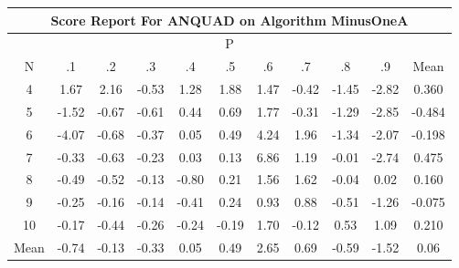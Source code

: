 \documentclass[11pt,a4paper]{report}
\begin{document}
\begin{longtable}{ | c || c | c | c | c | c | c | c | c | c || c |}
\hline
\multicolumn{11}{|c|}{ Score Report For ANQUAD on Algorithm MinusOneA} \\
\hline
\multicolumn{11}{|c|}{ P } \\
\hline
N & .1 & .2 & .3 & .4 & .5 & .6 & .7 & .8 & .9 & Mean\\
 \hline
 \hline
 \endhead
  4 &  \cellcolor[HTML]{D7D7FF} 1.67 &  \cellcolor[HTML]{C7C7FF} 2.16 &  \cellcolor[HTML]{FFEFEF} -0.53 &  \cellcolor[HTML]{DFDFFF} 1.28 &  \cellcolor[HTML]{CFCFFF} 1.88 &  \cellcolor[HTML]{D7D7FF} 1.47 &  \cellcolor[HTML]{FFF7F7} -0.42 &  \cellcolor[HTML]{FFD7D7} -1.45 &  \cellcolor[HTML]{FFB7B7} -2.82 & 0.360 \\
  5 &  \cellcolor[HTML]{FFD7D7} -1.52 &  \cellcolor[HTML]{FFEFEF} -0.67 &  \cellcolor[HTML]{FFEFEF} -0.61 &  \cellcolor[HTML]{F7F7FF} 0.44 &  \cellcolor[HTML]{EFEFFF} 0.69 &  \cellcolor[HTML]{CFCFFF} 1.77 &  \cellcolor[HTML]{FFF7F7} -0.31 &  \cellcolor[HTML]{FFDFDF} -1.29 &  \cellcolor[HTML]{FFB7B7} -2.85 & -0.484 \\
  6 &  \cellcolor[HTML]{FF9797} -4.07 &  \cellcolor[HTML]{FFEFEF} -0.68 &  \cellcolor[HTML]{FFF7F7} -0.37 &  \cellcolor[HTML]{FFFFFF} 0.05 &  \cellcolor[HTML]{EFEFFF} 0.49 &  \cellcolor[HTML]{9797FF} 4.24 &  \cellcolor[HTML]{CFCFFF} 1.96 &  \cellcolor[HTML]{FFDFDF} -1.34 &  \cellcolor[HTML]{FFC7C7} -2.07 & -0.198 \\
  7 &  \cellcolor[HTML]{FFF7F7} -0.33 &  \cellcolor[HTML]{FFEFEF} -0.63 &  \cellcolor[HTML]{FFF7F7} -0.23 &  \cellcolor[HTML]{FFFFFF} 0.03 &  \cellcolor[HTML]{FFFFFF} 0.13 &  \cellcolor[HTML]{5050FF} 6.86 &  \cellcolor[HTML]{DFDFFF} 1.19 &  \cellcolor[HTML]{FFFFFF} -0.01 &  \cellcolor[HTML]{FFB7B7} -2.74 & 0.475 \\
  8 &  \cellcolor[HTML]{FFEFEF} -0.49 &  \cellcolor[HTML]{FFEFEF} -0.52 &  \cellcolor[HTML]{FFFFFF} -0.13 &  \cellcolor[HTML]{FFE7E7} -0.80 &  \cellcolor[HTML]{F7F7FF} 0.21 &  \cellcolor[HTML]{D7D7FF} 1.56 &  \cellcolor[HTML]{D7D7FF} 1.62 &  \cellcolor[HTML]{FFFFFF} -0.04 &  \cellcolor[HTML]{FFFFFF} 0.02 & 0.160 \\
  9 &  \cellcolor[HTML]{FFF7F7} -0.25 &  \cellcolor[HTML]{FFFFFF} -0.16 &  \cellcolor[HTML]{FFFFFF} -0.14 &  \cellcolor[HTML]{FFF7F7} -0.41 &  \cellcolor[HTML]{F7F7FF} 0.24 &  \cellcolor[HTML]{E7E7FF} 0.93 &  \cellcolor[HTML]{E7E7FF} 0.88 &  \cellcolor[HTML]{FFEFEF} -0.51 &  \cellcolor[HTML]{FFDFDF} -1.26 & -0.075 \\
  10 &  \cellcolor[HTML]{FFF7F7} -0.17 &  \cellcolor[HTML]{FFF7F7} -0.44 &  \cellcolor[HTML]{FFF7F7} -0.26 &  \cellcolor[HTML]{FFF7F7} -0.24 &  \cellcolor[HTML]{FFF7F7} -0.19 &  \cellcolor[HTML]{D7D7FF} 1.70 &  \cellcolor[HTML]{FFFFFF} -0.12 &  \cellcolor[HTML]{EFEFFF} 0.53 &  \cellcolor[HTML]{E7E7FF} 1.09 & 0.210 \\
 \hline
 \hline
Mean &  \cellcolor[HTML]{FFEFEF} -0.74 &  \cellcolor[HTML]{FFFFFF} -0.13 &  \cellcolor[HTML]{FFF7F7} -0.33 &  \cellcolor[HTML]{FFFFFF} 0.05 &  \cellcolor[HTML]{EFEFFF} 0.49 &  \cellcolor[HTML]{BFBFFF} 2.65 &  \cellcolor[HTML]{EFEFFF} 0.69 &  \cellcolor[HTML]{FFEFEF} -0.59 &  \cellcolor[HTML]{FFD7D7} -1.52 &  \cellcolor[HTML]{FFFFFF} 0.06
\end{longtable}
\end{document}
